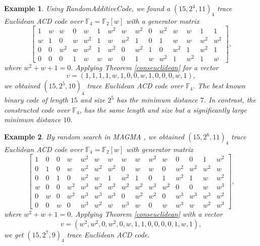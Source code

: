 \documentclass[sn-mathphys-num]{sn-jnl}%
\theoremstyle{thmstyleone}%
\theoremstyle{thmstyletwo}%
\newtheorem{example}{Example}%
\theoremstyle{thmstylethree}%
\begin{document}
\begin{example}
	Using  {\selectfont
		RandomAdditiveCode}, we found a $(15,2^4,11)_4$ trace Euclidean ACD code over $\mathbb{F}_4=\mathbb{F}_2[w]$ with a generator matrix 	
	$$ \begin{bmatrix}
		1&  w&   w&   0&    w&    1&  w^2&    w&  w^2&   0&  w^2&    w&      w&    1&   1\\
		w&  1&   0&   w&   w^2&   1&    w&  w^2&    1&   0&    1&    w&      w&  w^2& w^2\\
		0&  0&  w^2&  w&   w^2&   1&  w^2&   0&   w^2&   1&    0&   w^2&     1&  w^2&   1\\
		0&  0&   0&   1&     w&   w&    w&   0&     1&   w&  w^2&     1&   w^2&    1&   w
	\end{bmatrix},$$
	where $w^2+w+1=0.$ Applying Theorem \ref{conseuclidean} for a vector $$v=(  1, 1, 1, 1, w, 1, 0, 0, w, 1, 0, 0, 0, w, 1),$$ we obtained  $(15,2^5,10)_4$ trace Euclidean ACD code over $\mathbb{F}_4.$ 
	The best known binary code of length $15$ and size $2^5$ has the minimum distance $7$. In contrast, the constructed code over $\mathbb{F}_4$, has the same length and size but a significantly large minimum distance $10.$   
\end{example}

\begin{example}
	By random search in MAGMA \cite{magma}, we obtained $(15,2^6,11)_4$ trace Euclidean ACD code over $\mathbb{F}_4=\mathbb{F}_2[w]$ with generator matrix 
	$$\begin{bmatrix}
		1 & 0 & 0 & w & w^2 & w & w & w & w & w^2 & w & 0 & 0 & 1 & w^2\\
		0& 1& 0& w& w^2& w^2& w^2& 0& w& w& 0& w^2& w^2& w^2& w\\
		0& 0& 1& 0& w^2& w& 1& w^2& 1& 0& 1& w^2& 1& w& w^2\\
		w& 0& 0& w^2& w^3& w^2& w^2& w^2& w^2& w^3& w^2& 0& 0& w& w^3\\
		0& w& 0& w^2& w^3& w^3& w^3& 0& w^2& w^2& 0& w^3& w^3& w^3& w^2\\
		0& 0& w& 0& w^3& w^2& w& w^3& w& 0& w& w^3& w& w^2& w^3
	\end{bmatrix},$$
	where $w^2+w+1=0.$ Applying Theorem \ref{conseuclidean} with a vector $$v=(w^2, w^2,   0, w^2,   0,  w,   1,   1,   0,   0,   0,   0,   1,   w,   1),$$ we get $(15,2^7,9)_4$ trace Euclidean ACD code.	
\end{example}
\end{document}
